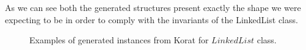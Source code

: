 \begin{code}
As we can see both the generated
structures present exactly the shape we were expecting to be in order to comply with the invariants of the LinkedList class.

\begin{figure}[!ht]
\centerline{
\hfil
{}}
\caption{Examples of generated instances from Korat for $LinkedList$ class.}
\label{fig:insts}
\end{figure}


\end{code}
